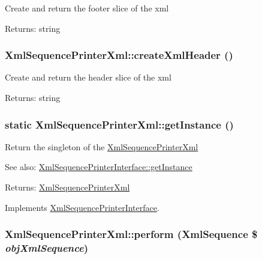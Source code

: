 Create and return the footer slice of the xml

\begin{Desc}
\item[Returns:]string \end{Desc}
\hypertarget{class_xml_sequence_printer_xml_534160e28dc8623f138311e4a73be081}{
\subsubsection[{createXmlHeader}]{\setlength{\rightskip}{0pt plus 5cm}XmlSequencePrinterXml::createXmlHeader ()}}
\label{class_xml_sequence_printer_xml_534160e28dc8623f138311e4a73be081}


Create and return the header slice of the xml

\begin{Desc}
\item[Returns:]string \end{Desc}
\hypertarget{class_xml_sequence_printer_xml_1c628de89547bd7a6aa509748e562e67}{
\subsubsection[{getInstance}]{\setlength{\rightskip}{0pt plus 5cm}static XmlSequencePrinterXml::getInstance ()}}
\label{class_xml_sequence_printer_xml_1c628de89547bd7a6aa509748e562e67}


Return the singleton of the \hyperlink{class_xml_sequence_printer_xml}{XmlSequencePrinterXml}

\begin{Desc}
\item[See also:]\hyperlink{interface_xml_sequence_printer_interface_d488a9fe62e4e3018e482d31497d5e99}{XmlSequencePrinterInterface::getInstance} \end{Desc}
\begin{Desc}
\item[Returns:]\hyperlink{class_xml_sequence_printer_xml}{XmlSequencePrinterXml} \end{Desc}


Implements \hyperlink{interface_xml_sequence_printer_interface_d488a9fe62e4e3018e482d31497d5e99}{XmlSequencePrinterInterface}.\hypertarget{class_xml_sequence_printer_xml_7e88c479f35acfc1ce0f053c4dbadb1b}{
\subsubsection[{perform}]{\setlength{\rightskip}{0pt plus 5cm}XmlSequencePrinterXml::perform ({\bf XmlSequence} \$ {\em objXmlSequence})}}
\label{class_xml_sequence_printer_xml_7e88c479f35acfc1ce0f053c4dbadb1b}


